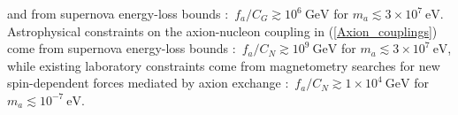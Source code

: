 and from supernova energy-loss bounds \cite{Graham2013,Raffelt1990Review}:~$f_a / C_G \gtrsim 10^6 ~\textrm{GeV}$ for $m_a \lesssim 3 \times 10^{7}~\textrm{eV}$.
{\color{black}Astrophysical constraints on the axion-nucleon coupling in (\ref{Axion_couplings}) come from supernova energy-loss bounds \cite{Raffelt1990Review,Raffelt2008LNP}:~$f_a / C_N \gtrsim 10^9 ~\textrm{GeV}$ for $m_a \lesssim 3 \times 10^{7}~\textrm{eV}$, while existing laboratory constraints come from magnetometry searches for new spin-dependent forces mediated by axion exchange \cite{Romalis2009_NF}:~$f_a / C_N \gtrsim 1 \times 10^4 ~\textrm{GeV}$ for $m_a \lesssim 10^{-7}~\textrm{eV}$. }



